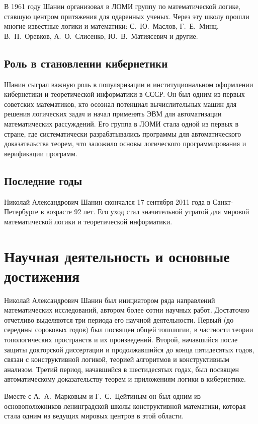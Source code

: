 \documentclass[essay,paper]{pmk-graduate}
\begin{document}
В 1961 году Шанин организовал в ЛОМИ группу по математической логике, ставшую центром притяжения для одаренных ученых. Через эту школу прошли многие известные логики и математики: С.~Ю.~Маслов, Г.~Е.~Минц, В.~П.~Оревков, А.~О.~Слисенко, Ю.~В.~Матиясевич и другие.

\subsection{Роль в становлении кибернетики}

 Шанин сыграл важную роль в популяризации и институциональном оформлении кибернетики и теоретической информатики в СССР. Он был одним из первых советских математиков, кто осознал потенциал вычислительных машин для решения логических задач и начал применять ЭВМ для автоматизации математических рассуждений. Его группа в ЛОМИ стала одной из первых в стране, где систематически разрабатывались программы для автоматического доказательства теорем, что заложило основы логического программирования и верификации программ.

\subsection{Последние годы}

Николай Александрович Шанин скончался 17 сентября 2011 года в Санкт-Петербурге в возрасте 92 лет. Его уход стал значительной утратой для мировой математической логики и теоретической информатики.

\section{Научная деятельность и основные достижения}

Николай Александрович Шанин был инициатором ряда направлений математических исследований, автором более сотни научных работ. Достаточно отчетливо выделяются три периода его научной деятельности. Первый (до середины сороковых годов) был посвящен общей топологии, в частности теории топологических пространств и их произведений. Второй, начавшийся после защиты докторской диссертации и продолжавшийся до конца пятидесятых годов, связан с конструктивной логикой, теорией алгоритмов и конструктивным анализом. Третий период, начавшийся в шестидесятых годах, был посвящен автоматическому доказательству теорем и приложениям логики в кибернетике.

Вместе с А.~А.~Марковым и Г.~С.~Цейтиным он был одним из основоположников ленинградской школы конструктивной математики, которая стала одним из ведущих мировых центров в этой области.
\end{document}
